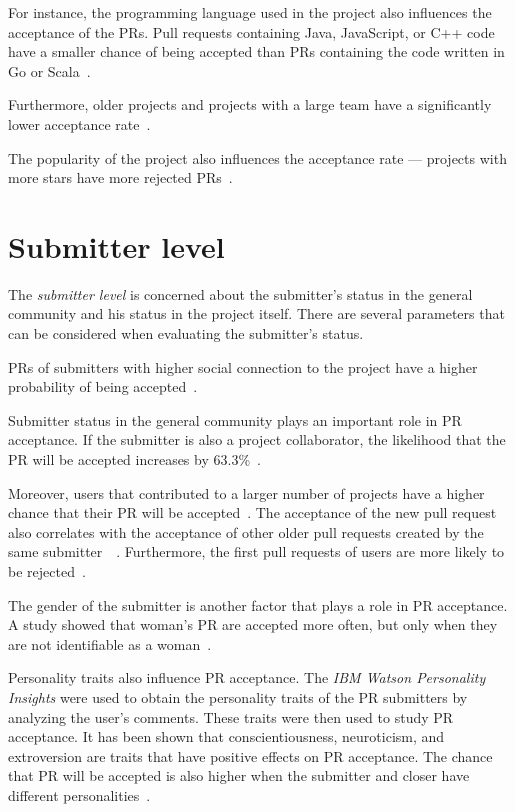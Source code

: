 \documentclass[digital,oneside,oldtable,nolof,nolot,nocover]{fithesis4}
\begin{document}
For instance, the programming language used in the project also influences
the acceptance of the PRs. Pull requests containing Java, JavaScript, or C++
code have a smaller chance of being accepted than PRs containing the code
written in Go or Scala~\cite{factors}.

Furthermore, older projects and projects with a large team have a
significantly lower acceptance rate~\cite{social}.

The popularity of the project also influences the acceptance rate ---
projects with more stars have more rejected PRs~\cite{social}.
\section{Submitter level}
\label{sec:org137df75}
The \emph{submitter level} is concerned about the submitter's status in the
general community and his status in the project itself. There are several
parameters that can be considered when evaluating the submitter's status.

PRs of submitters with higher social connection to the project have a higher
probability of being accepted~\cite{social}.

Submitter status in the general community plays an important role in PR
acceptance. If the submitter is also a project collaborator, the likelihood
that the PR will be accepted increases by 63.3\%~\cite{social}.

Moreover, users that contributed to a larger number of projects have a higher
chance that their PR will be accepted~\cite{npm2}. The acceptance of the new
pull request also correlates with the acceptance of other older pull requests
created by the same submitter~\cite{npm}~\cite{replication}. Furthermore,
the first pull requests of users are more likely to be rejected~\cite{developers}.

The gender of the submitter is another factor that plays a role in PR
acceptance. A study showed that woman's PR are accepted more often, but only
when they are not identifiable as a woman~\cite{gender}.

Personality traits also influence PR acceptance. The \emph{IBM Watson Personality
Insights} were used to obtain the personality traits of the PR submitters by
analyzing the user's comments. These traits were then used to study PR
acceptance. It has been shown that conscientiousness, neuroticism, and
extroversion are traits that have positive effects on PR acceptance. The
chance that PR will be accepted is also higher when the submitter and closer
have different personalities~\cite{personality}.
\end{document}
